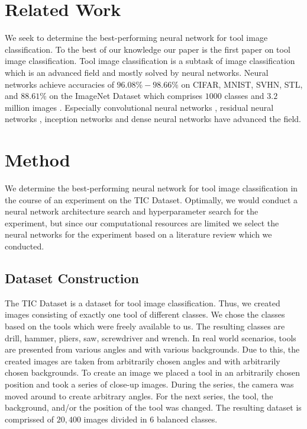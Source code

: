 \documentclass[a4paper, 10pt, journal]{wissarbIEEE}
\begin{document}
\section{Related Work}
\label{sec:relwork}
We seek to determine the best-performing neural network for tool image classification. To the best of our knowledge our paper is the first paper on tool image classification. Tool image classification is a subtask of image classification which is an advanced field and mostly solved by neural networks. Neural networks achieve accuracies of $96.08\%-98.66\%$ on CIFAR, MNIST, SVHN, STL, and $88.61\%$ on the ImageNet Dataset \cite{Foret.2020, Kabir.2020} which comprises $1000$ classes and $3.2$ million images \cite{imagenet.2019}. Especially convolutional neural networks \cite{LeCun.2015b}, residual neural networks \cite{He.2016}, inception networks \cite{Szegedy.2015} and dense neural networks \cite{Huang.2017} have advanced the field.

\section{Method}
\label{sec:metho}
We determine the best-performing neural network for tool image classification in the course of an experiment on the TIC Dataset. Optimally, we would conduct a neural network architecture search and hyperparameter search for the experiment, but since our computational resources are limited we select the neural networks for the experiment based on a literature review which we conducted.

\subsection{Dataset Construction}
The TIC Dataset is a dataset for tool image classification. Thus, we created images consisting of exactly one tool of different classes. We chose the classes based on the tools which were freely available to us. The resulting classes are drill, hammer, pliers, saw, screwdriver and wrench.  In real world scenarios, tools are presented
from various angles and with various backgrounds. Due to this, the created images
are taken from arbitrarily chosen angles and with arbitrarily chosen backgrounds. To  create an image we placed a tool in an arbitrarily chosen position and took a series of \mbox{close-up} images. During the series, the camera was moved around to create arbitrary angles. For the next series, the tool, the background,
and/or the position of the tool was changed. The resulting dataset is comprissed of $20,400$ images divided in $6$ balanced classes.
\end{document}
